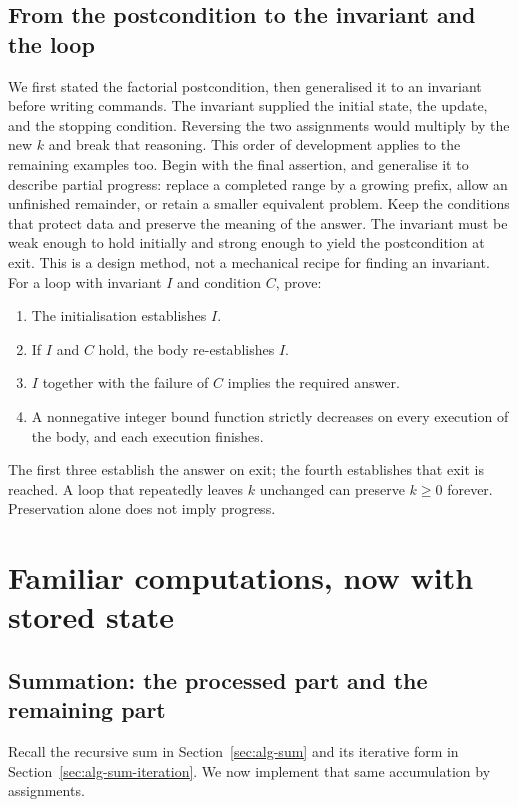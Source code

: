 \subsection{From the postcondition to the invariant and the loop}

We first stated the factorial postcondition, then generalised it to an
invariant before writing commands. The invariant supplied
the initial state, the update, and the stopping condition. Reversing the
two assignments would multiply by the new $k$ and break that reasoning.
This order of development applies to the remaining examples too.
Begin with the final assertion, and generalise it to describe partial
progress: replace a completed range by a growing prefix, allow an
unfinished remainder, or retain a smaller equivalent problem. Keep the
conditions that protect data and preserve the meaning of the answer.
The invariant must be weak enough to hold initially and strong enough to
yield the postcondition at exit. This is a design method, not a mechanical
recipe for finding an invariant.
For a loop with invariant $I$ and condition $C$, prove:
\begin{enumerate}
\item The initialisation establishes $I$.
\item If $I$ and $C$ hold, the body re-establishes $I$.
\item $I$ together with the failure of $C$ implies the required answer.
\item A nonnegative integer bound function strictly decreases on every
execution of the body, and each execution finishes.
\end{enumerate}
The first three establish the answer on exit; the fourth establishes that
exit is reached. A loop that repeatedly leaves $k$ unchanged can preserve
$k\geq0$ forever. Preservation alone does not imply progress.

\section{Familiar computations, now with stored state}

\subsection{Summation: the processed part and the remaining part}

Recall the recursive sum in Section~\ref{sec:alg-sum} and its iterative
form in Section~\ref{sec:alg-sum-iteration}. We now implement that same
accumulation by assignments.

